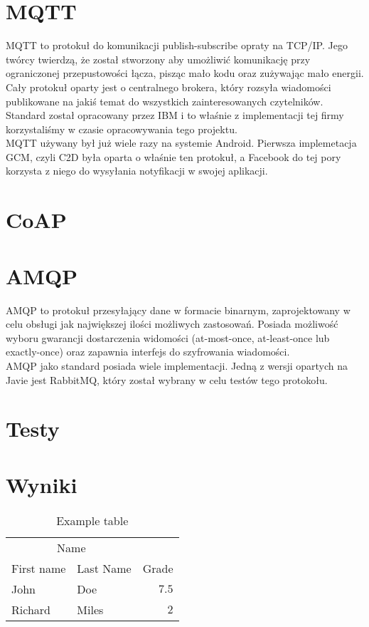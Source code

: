 \documentclass[twoside]{article}
\begin{document}
\begin{multicols}{2}
\section{MQTT}
MQTT to protokuł do komunikacji publish-subscribe opraty na TCP/IP. Jego twórcy twierdzą, że został stworzony aby umożliwić komunikację przy ograniczonej przepustowości łącza, pisząc mało kodu oraz zużywając mało energii. Cały protokuł oparty jest o centralnego brokera, który rozsyła wiadomości publikowane na jakiś temat do wszystkich zainteresowanych czytelników. Standard został opracowany przez IBM i to właśnie z implementacji tej firmy korzystaliśmy w czasie opracowywania tego projektu.
\\ MQTT używany był już wiele razy na systemie Android. Pierwsza implemetacja GCM, czyli C2D była oparta o właśnie ten protokuł, a Facebook do tej pory korzysta z niego do wysyłania notyfikacji w swojej aplikacji.

\section{CoAP}

\section{AMQP}
AMQP to protokuł przesyłający dane w formacie binarnym, zaprojektowany w celu obsługi jak największej ilości możliwych zastosowań. Posiada możliwość wyboru gwarancji dostarczenia widomości (at-most-once, at-least-once lub exactly-once) oraz zapawnia interfejs do szyfrowania wiadomości.
\\ AMQP jako standard posiada wiele implementacji. Jedną z wersji opartych na Javie jest RabbitMQ, który został wybrany w celu testów tego protokołu.

\section{Testy}

\section{Wyniki}
\begin{table}[H]
\caption{Example table}
\centering
\begin{tabular}{llr}
\toprule
\multicolumn{2}{c}{Name} \\
\cmidrule(r){1-2}
First name & Last Name & Grade \\
\midrule
John & Doe & $7.5$ \\
Richard & Miles & $2$ \\
\bottomrule
\end{tabular}
\end{table}


\end{multicols}
\end{document}
